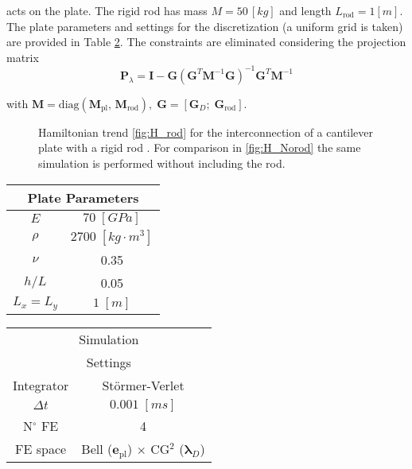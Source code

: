 \documentclass[letterpaper, 10 pt, conference]{ieeeconf}
\begin{document}
acts on the plate. The rigid rod has mass $M = 50 \, [kg]$ and length $L_{\text{rod}} = 1 [m]$. The plate parameters and settings for the discretization (a uniform grid is taken) are provided in Table \ref{tab:par}. The constraints are eliminated considering the projection matrix \cite{Heiland_red}
\begin{equation} \label{eq:proj}
\bm{P}_{\lambda} = \bm{I} - \bm{G} \left(\bm{G}^T \bm{M}^{-1} \bm{G} \right)^{-1} \bm{G}^T \bm{M}^{-1}
\end{equation}
 
with $\bm{M} = \text{diag}(\bm{M}_{\text{pl}}, \, \bm{M}_{\text{rod}}), \; \bm{G} = [\bm{G}_D; \; \bm{G}_{\text{rod}}]$.

\begin{figure}[t]
\centering
{}
\hfil
{}
\caption{Hamiltonian trend \ref{fig:H_rod} for the interconnection of a cantilever plate with a rigid rod . For comparison in \ref{fig:H_Norod} the same simulation is performed without including the rod.}
\label{fig:HamInt}
\end{figure}
\begin{table}[t]
	\centering
	\begin{tabular}{|c|c|}
		\hline 
		\multicolumn{2}{|c|}{Plate Parameters} \\ 
		\hline 
		$E$ & $70\; [GPa]$ \\ 
		$\rho$ & $2700\; [kg \cdot m^3]$ \\ 
		$\nu$& 0.35 \\ 
		$h/L$& 0.05 \\ 
		$L_x = L_y$& $1\; [m]$\\ 
		\hline 
	\end{tabular} 
	\begin{tabular}{|c|c|}
		\hline 
		\multicolumn{2}{|c|}{Simulation} \\ 
		\multicolumn{2}{|c|}{Settings} \\
		\hline 
		Integrator & St\"ormer-Verlet \\
		$\Delta t $ & $0.001 \; [ms]$ \\  
		N$^\circ$ FE & 4 \\
		FE space & Bell ($\bm{e}_{\text{pl}}$) $\times$ CG$^2$ ($\bm{\lambda}_D$)\\
		\hline 
	\end{tabular} 
	\captionsetup{width=0.95\linewidth}
	\vspace{1mm}
	\label{tab:par}
\end{table}
\end{document}
